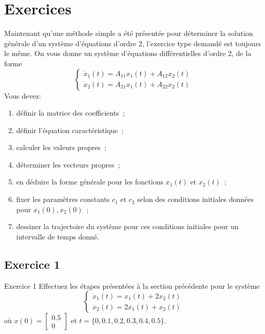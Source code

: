     \section{Exercices}
        Maintenant qu'une méthode simple a été présentée pour déterminer la solution générale d'un système d'équations d'ordre 2, l'exercice type demandé est toujours le même. On vous donne un système d'équations différentielles d'ordre 2, de la forme
        \begin{equation}
            \begin{cases}
                \dot{x}_1(t)=A_{11} x_1(t) + A_{12} x_2(t)\\
                \dot{x}_2(t)=A_{21} x_1(t) + A_{22} x_2(t)
            \end{cases}
        \end{equation}
        Vous devez:
        \begin{enumerate}
            \item définir la matrice des coefficients~;
            \item définir l'équation caractéristique~;
            \item calculer les valeurs propres~;
            \item déterminer les vecteurs propres~;
            \item en déduire la forme générale pour les fonctions $x_1(t)$ et $x_2(t)$~;
            \item fixer les paramètres constants $c_1$ et $c_2$ selon des conditions initiales données pour $x_1(0), x_2(0)$~;
            \item dessiner la trajectoire du système pour ces conditions initiales pour un intervalle de temps donné.
        \end{enumerate}
        \subsection{Exercice 1}
            \begin{exercise}{Exercice 1}
                Effectuez les étapes présentées à la section précédente pour le système
                \begin{equation}
                    \begin{cases}
                        \dot{x}_1(t)=x_1(t) + 2 x_2(t)\\
                        \dot{x}_2(t)=2 x_1(t) + x_2(t)
                    \end{cases}
                \end{equation}
                où $x(0)=\begin{bmatrix} 0.5 \\ 0 \end{bmatrix}$ et $t=\{0, 0.1, 0.2, 0.3, 0.4, 0.5\}$.
            \end{exercise}
